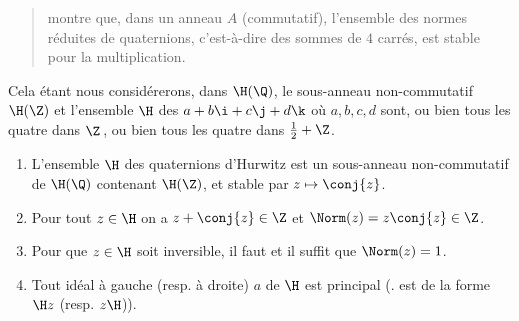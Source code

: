 \documentclass[11pt, useosf,
  title in boldface,
  theorem in new line,
  theorem numbering = section,
  number theorems separately,
]{simplivre}
\begin{document}
    \vspace{-\baselineskip}
    \begin{quote}
         montre que, dans un anneau \( A \) (commutatif), l'ensemble des normes réduites de quaternions, c'est-à-dire des sommes de \( 4 \) carrés, est stable pour la multiplication.
    \end{quote}

    Cela étant nous considérerons, dans \( \H(\Q) \), le sous-anneau non-commutatif \( \H(\Z) \) et l'ensemble \( \H \) des  \( a+b\i+c\j+d\k \) où \( a,b,c,d \) sont, ou bien tous les quatre dans \( \Z \)\,, ou bien tous les quatre dans \( \frac{1}{2}+\Z \).

    \begin{lemma}\label{lem:quaternions d'Hurwitz}
        \begin{enumerate}
            \item \label{lem:quaternions d'Hurwitz;item1} L'ensemble \( \H \) des quaternions d'Hurwitz est un sous-anneau non-commutatif de \( \H(\Q) \) contenant \( \H(\Z) \), et stable par \( z \mapsto \conj{z} \).
            \item \label{lem:quaternions d'Hurwitz;item2} Pour tout \( z \in \H \) on a \( z+\conj{z} \in \Z \) et \( \Norm(z) = z\conj{z} \in \Z \).
            \item \label{lem:quaternions d'Hurwitz;item3} Pour que \( z \in \H \) soit inversible, il faut et il suffit que \( \Norm(z) = 1 \).
            \item \label{lem:quaternions d'Hurwitz;item4} Tout idéal à gauche (resp. à droite) \( a \) de \( \H \) est principal (\ie. est de la forme \( \H z \) (resp. \( z \H \))).
        \end{enumerate}
    \end{lemma}
\end{document}

